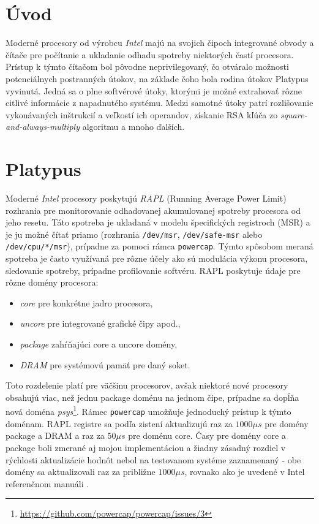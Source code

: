 \newcommand{\code}{\texttt}

\chapter{Úvod}
Moderné procesory od výrobcu \emph{Intel} majú na svojich čipoch integrované obvody a čítače pre počítanie a ukladanie odhadu spotreby niektorých častí procesora.
Prístup k týmto čítačom bol pôvodne neprivilegovaný, čo otváralo možnosti potenciálnych postranných útokov, na základe čoho bola rodina útokov
Platypus vyvinutá. Jedná sa o plne softvérové útoky, ktorými je možné extrahovať rôzne citlivé informácie z napadnutého systému. Medzi samotné útoky
patrí rozlišovanie vykonávaných inštrukcií a veľkostí ich operandov, získanie RSA kľúča zo \emph{square-and-always-multiply} algoritmu a mnoho ďalších.

\chapter{Platypus}
Moderné \emph{Intel} procesory poskytujú \emph{RAPL} (Running Average Power Limit) rozhrania pre monitorovanie odhadovanej akumulovanej spotreby procesora
od jeho resetu. Táto spotreba je ukladaná v modelu špecifických registroch (MSR) a je ju možné čítať priamo (rozhrania \code{/dev/msr}, \code{/dev/safe-msr}
alebo \code{/dev/cpu/*/msr}),
prípadne za pomoci rámca \code{powercap}. Týmto spôsobom meraná spotreba je často využívaná pre rôzne účely ako sú modulácia výkonu procesora,
sledovanie spotreby, prípadne profilovanie softvéru.
RAPL poskytuje údaje pre rôzne domény procesora:
\begin{itemize}
    \item \emph{core} pre konkrétne jadro procesora,
    \item \emph{uncore} pre integrované grafické čipy apod.,
    \item \emph{package} zahŕňajúci core a uncore domény,
    \item \emph{DRAM} pre systémovú pamäť pre daný soket.
\end{itemize}
Toto rozdelenie platí pre väčšinu procesorov, avšak niektoré nové procesory obsahujú viac, než jednu package doménu na jednom čipe, prípadne sa dopĺňa
nová doména \emph{psys}\footnote{\href{https://github.com/powercap/powercap/issues/3}{https://github.com/powercap/powercap/issues/3}}.
Rámec \code{powercap} umožňuje jednoduchý prístup k týmto doménam.
RAPL registre sa podľa zistení \cite{Platypus} aktualizujú raz za $1000 \mu s$ pre domény package a DRAM a raz za $50 \mu s$ pre doménu core.
Časy pre domény core a package boli zmerané aj mojou implementáciou a žiadny zásadný rozdiel v rýchlosti aktualizácie hodnôt
nebol na testovanom systéme zaznamenaný - obe domény sa aktualizovali raz za približne $1000 \mu s$, rovnako ako je uvedené v Intel referenčnom
manuáli \cite{intel_manual}.

